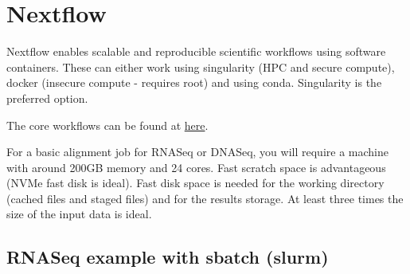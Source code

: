 \documentclass[
]{book}
\begin{document}
\hypertarget{nextflow}{%
\section{Nextflow}\label{nextflow}}

Nextflow enables scalable and reproducible scientific workflows using software containers. These can either work using singularity (HPC and secure compute), docker (insecure compute - requires root) and using conda. Singularity is the preferred option.

The core workflows can be found at \href{https://nf-co.re/}{here}.

For a basic alignment job for RNASeq or DNASeq, you will require a machine with around 200GB memory and 24 cores. Fast scratch space is advantageous (NVMe fast disk is ideal). Fast disk space is needed for the working directory (cached files and staged files) and for the results storage. At least three times the size of the input data is ideal.

\hypertarget{rnaseq-example-with-sbatch-slurm}{%
\subsection{RNASeq example with sbatch (slurm)}\label{rnaseq-example-with-sbatch-slurm}}
\end{document}
